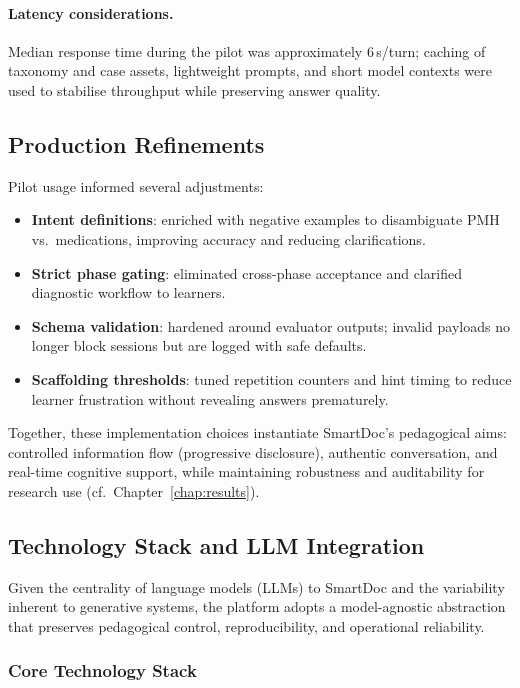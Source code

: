 \paragraph{Latency considerations.}
Median response time during the pilot was approximately 6\,s/turn; caching of
taxonomy and case assets, lightweight prompts, and short model contexts were
used to stabilise throughput while preserving answer quality.

\subsection{Production Refinements}
\label{sec:prod_refinements}

Pilot usage informed several adjustments:
\begin{itemize}
  \item \textbf{Intent definitions}: enriched with negative examples to disambiguate
        PMH vs.\ medications, improving accuracy and reducing clarifications.
  \item \textbf{Strict phase gating}: eliminated cross-phase acceptance and clarified
        diagnostic workflow to learners.
  \item \textbf{Schema validation}: hardened around evaluator outputs; invalid payloads
        no longer block sessions but are logged with safe defaults.
  \item \textbf{Scaffolding thresholds}: tuned repetition counters and hint timing to
        reduce learner frustration without revealing answers prematurely.
\end{itemize}

\medskip
\noindent
Together, these implementation choices instantiate SmartDoc’s pedagogical aims:
controlled information flow (progressive disclosure), authentic conversation,
and real-time cognitive support, while maintaining robustness and auditability
for research use (cf.\ Chapter~\ref{chap:results}).

\subsection{Technology Stack and LLM Integration}
\label{sec:tech_stack_llm}

Given the centrality of language models (LLMs) to SmartDoc and the variability inherent
to generative systems, the platform adopts a model-agnostic abstraction that
preserves pedagogical control, reproducibility, and operational reliability.

\subsubsection{Core Technology Stack}


